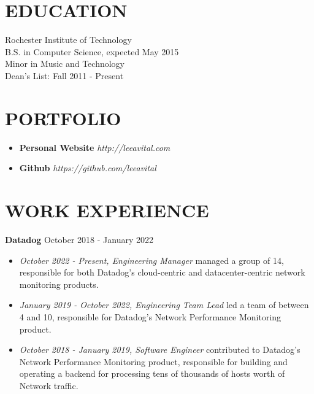 \documentclass[line,margin]{res}
\begin{document}
\address{(646) 320-9143\\leeavital@gmail.com}

\begin{resume}

\section{EDUCATION}   Rochester Institute of Technology \\
                      B.S. in  Computer Science,  expected May 2015 \\
	                    Minor in Music and Technology\\
	                    Dean's List: Fall 2011 - Present


\section{PORTFOLIO}

\begin{itemize}
\item {\bf Personal Website}  {\sl http://leeavital.com}
\item {\bf Github} {\sl  https://github.com/leeavital }
\end{itemize}



\section{WORK EXPERIENCE}

{\bf Datadog} \hfill October 2018 - January 2022 \\
\begin{itemize}
  \item \textit{October 2022 - Present, Engineering Manager} managed a group of 14, responsible for both Datadog's cloud-centric and datacenter-centric network monitoring products.
  \item \textit{January 2019 - October 2022, Engineering Team Lead} led a team of between 4 and 10, responsible for Datadog's Network Performance Monitoring product.
  \item \textit{October 2018 - January 2019, Software Engineer} contributed to Datadog's Network Performance Monitoring product, responsible for building and operating a backend for processing tens of thousands of hosts worth of Network traffic.
\end{itemize}


\end{resume}
\end{document}
